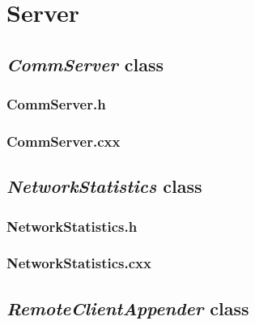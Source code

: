 \chapter{Server}

\section{\textit{CommServer} class}

\subsection{CommServer.h}


\newpage

\subsection{CommServer.cxx}


\newpage


\section{\textit{NetworkStatistics} class}

\subsection{NetworkStatistics.h}


\newpage

\subsection{NetworkStatistics.cxx}


\newpage


\section{\textit{RemoteClientAppender} class}

